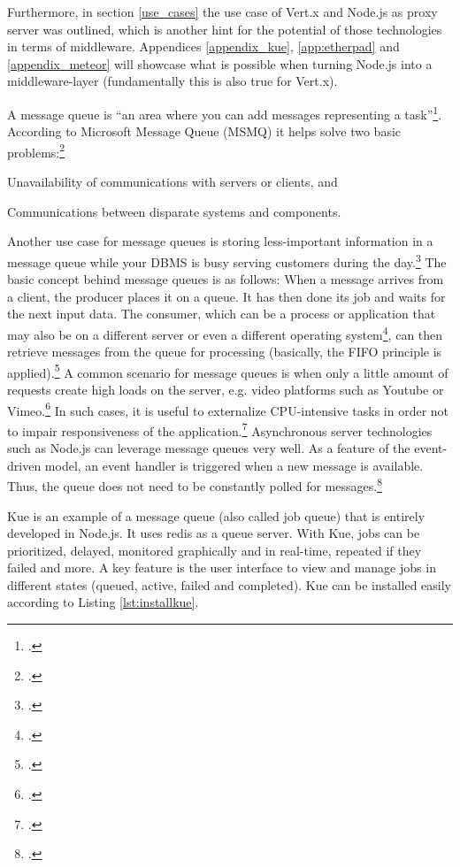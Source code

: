 \begin{appendices}
\begin{subappendices}
Furthermore, in section \ref{use_cases} the use case of Vert.x and Node.js as proxy server was outlined, which is another hint for the potential of those technologies in terms of middleware. Appendices \ref{appendix_kue}, \ref{app:etherpad} and \ref{appendix_meteor} will showcase what is possible when turning Node.js into a middleware-layer (fundamentally this is also true for Vert.x). 

\label{appendix_kue}

A message queue is “an area where you can add messages representing a task”\footcite[][2]{McGlennon_2007}. According to Microsoft Message Queue (MSMQ) it helps solve two basic problems:\footcite[Cf.][1]{McGlennon_2007}
\begin{description}
  \item Unavailability of communications with servers or clients, and 
  \item Communications between disparate systems and components.
\end{description}
Another use case for message queues is storing less-important information in a message queue while your DBMS is busy serving customers during the day.\footcite[Cf.][449]{Thomson_2002}
The basic concept behind message queues is as follows: When a message arrives from a client, the producer places it on a queue. It has then done its job and waits for the next input data. The consumer, which can be a process or application that may also be on a different server or even a different operating system\footcite[Cf.][2]{McGlennon_2007}, can then retrieve messages from the queue for processing (basically, the FIFO principle is applied).\footcite[Cf.][450]{Thomson_2002}
A common scenario for message queues is when only a little amount of requests create high loads on the server, e.g. video platforms such as Youtube or Vimeo.\footcite[Cf.][247]{Roden_2012} In such cases, it is useful to externalize CPU-intensive tasks in order not to impair responsiveness of the application.\footcite[Cf.][247]{Roden_2012}
Asynchronous server technologies such as Node.js can leverage message queues very well. As a feature of the event-driven model, an event handler is triggered when a new message is available. Thus, the queue does not need to be constantly polled for messages.\footcite[Cf.][]{Knight_2011}

Kue is an example of a message queue (also called job queue) that is entirely developed in Node.js. It uses redis as a queue server. With Kue, jobs can be prioritized, delayed, monitored graphically and in real-time, repeated if they failed and more. A key feature is the user interface to view and manage jobs in different states (queued, active, failed and completed). Kue can be installed easily according to Listing \ref{lst:installkue}.


\end{subappendices}
\end{appendices}
